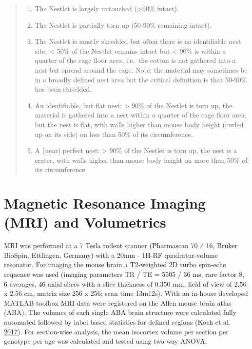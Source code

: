 \documentclass[onehalf,12pt]{beavtex}
\providecommand{\tightlist}{%
  \setlength{\itemsep}{0pt}\setlength{\parskip}{0pt}}
\begin{document}
  \begin{quote}
  \begin{enumerate}
  \def\labelenumi{\arabic{enumi}.}
  \tightlist
  \item
    The Nestlet is largely untouched (\textgreater{}90\% intact).
  \item
    The Nestlet is partially torn up (50-90\% remaining intact).
  \item
    The Nestlet is mostly shredded but often there is no identifiable nest
    site: \textless{} 50\% of the Nestlet remains intact but \textless{}
    90\% is within a quarter of the cage floor area, i.e.~the cotton is
    not gathered into a nest but spread around the cage. Note: the
    material may sometimes be in a broadly defined nest area but the
    critical definition is that 50-90\% has been shredded.
  \item
    An identifiable, but flat nest: \textgreater{} 90\% of the Nestlet is
    torn up, the material is gathered into a nest within a quarter of the
    cage floor area, but the nest is flat, with walls higher than mouse
    body height (curled up on its side) on less than 50\% of its
    circumference.
  \item
    A (near) perfect nest: \textgreater{} 90\% of the Nestlet is torn up,
    the nest is a crater, with walls higher than mouse body height on more
    than 50\% of its circumference
  \end{enumerate}
  \end{quote}
  
  \section{Magnetic Resonance Imaging (MRI) and
  Volumetrics}\label{magnetic-resonance-imaging-mri-and-volumetrics}
  
  MRI was performed at a 7 Tesla rodent scanner (Pharmascan 70 ⁄ 16,
  Bruker BioSpin, Ettlingen, Germany) with a 20mm - 1H-RF quadratur-volume
  resonator. For imaging the mouse brain a T2-weighted 2D turbo spin-echo
  sequence was used (imaging parameters TR / TE = 5505 / 36 ms, rare
  factor 8, 6 averages, 46 axial slices with a slice thickness of 0.350
  mm, field of view of 2.56 x 2.56 cm, matrix size 256 x 256; scan time
  13m12s). With an in-house developed MATLAB toolbox MRI data were
  registered on the Allen mouse brain atlas (ABA). The volumes of each
  single ABA brain structure were calculated fully automated followed by
  label based statistics for defined regions (Koch et al.
  \protect\hyperlink{ref-KochAtlasregistrationedemacorrected2017}{2017}).
  For section-wise analysis, the mean isocortex volume per section per
  genotype per age was calculated and tested using two-way ANOVA.
  
\end{document}
